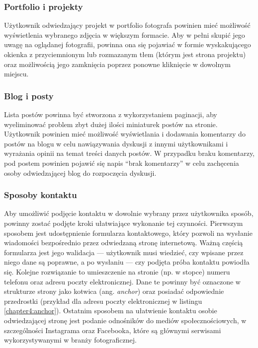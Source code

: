 \documentclass[12pt]{article}
\numberwithin{figure}{section}
\begin{document}
\begin{sloppypar}
\subsubsection*{Portfolio i projekty}

Użytkownik odwiedzający projekt w portfolio fotografa powinien mieć możliwość wyświetlenia wybranego zdjęcia w większym formacie. Aby w pełni skupić jego uwagę na oglądanej fotografii, powinna ona się pojawiać w formie wyskakującego okienka z przyciemnionym lub rozmazanym tłem (którym jest strona projektu) oraz możliwością jego zamknięcia poprzez ponowne kliknięcie w dowolnym miejscu. 

\subsubsection*{Blog i posty}

Lista postów powinna być stworzona z wykorzystaniem paginacji, aby wyeliminować problem zbyt dużej ilości miniaturek postów na stronie. Użytkownik powinien mieć możliwość wyświetlania i dodawania komentarzy do postów na blogu w celu nawiązywania dyskusji z innymi użytkownikami i wyrażania opinii na temat treści danych postów. W przypadku braku komentarzy, pod postem powinien pojawić się napis ``brak komentarzy'' w celu zachęcenia osoby odwiedzającej blog do rozpoczęcia dyskusji. 


\subsubsection*{Sposoby kontaktu}

Aby umożliwić podjęcie kontaktu w dowolnie wybrany przez użytkownika sposób, powinny zostać podjęte kroki ułatwiające wykonanie tej czynności. Pierwszym sposobem jest udostępnienie formularza kontaktowego, który pozwoli na wysłanie wiadomości bezpośrednio przez odwiedzaną stronę internetową. Ważną częścią formularza jest jego walidacja --- użytkownik musi wiedzieć, czy wpisane przez niego dane są poprawne, a po wysłaniu --- czy podjęta próba kontaktu powiodła się. Kolejne rozwiązanie to umieszczenie na stronie (np. w stopce) numeru telefonu oraz adresu poczty elektronicznej. Dane te powinny być oznaczone w strukturze strony jako kotwica (ang. \textit{anchor}) oraz posiadać odpowiednie przedrostki (przykład dla adresu poczty elektronicznej w listingu \ref{chapter4:anchor}). Ostatnim sposobem na ułatwienie kontaktu osobie odwiedzającej stronę jest podanie odnośników do mediów społecznościowych, w szczególności Instagrama oraz Facebooka, które są głównymi serwisami wykorzystywanymi w branży fotograficznej.


\end{sloppypar}
\end{document}
